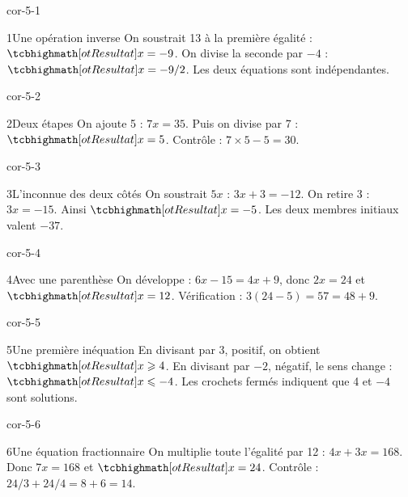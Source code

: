 \clearpage\pagestyle{otMain}\fontsize{11}{15}\selectfont{}
\begin{blocLivre}{cor-5-1}\begin{corrige}{1}{Une opération inverse}
On soustrait 13 à la première égalité : $\res{x=-9}$. On divise la seconde par $-4$ : $\res{x=-9/2}$. Les deux équations sont indépendantes.
\end{corrige}\end{blocLivre}
\begin{blocLivre}{cor-5-2}\begin{corrige}{2}{Deux étapes}
On ajoute 5 : $7x=35$. Puis on divise par 7 : $\res{x=5}$. Contrôle : $7\times5-5=30$.
\end{corrige}\end{blocLivre}
\begin{blocLivre}{cor-5-3}\begin{corrige}{3}{L’inconnue des deux côtés}
On soustrait $5x$ : $3x+3=-12$. On retire 3 : $3x=-15$. Ainsi $\res{x=-5}$. Les deux membres initiaux valent $-37$.
\end{corrige}\end{blocLivre}
\begin{blocLivre}{cor-5-4}\begin{corrige}{4}{Avec une parenthèse}
On développe : $6x-15=4x+9$, donc $2x=24$ et $\res{x=12}$. Vérification : $3(24-5)=57=48+9$.
\end{corrige}\end{blocLivre}
\begin{blocLivre}{cor-5-5}\begin{corrige}{5}{Une première inéquation}
En divisant par 3, positif, on obtient $\res{x\ge4}$. En divisant par $-2$, négatif, le sens change : $\res{x\le-4}$. Les crochets fermés indiquent que 4 et $-4$ sont solutions.
\label{fig-cor-5-5}
\end{corrige}\end{blocLivre}
\begin{blocLivre}{cor-5-6}\begin{corrige}{6}{Une équation fractionnaire}
On multiplie toute l’égalité par 12 : $4x+3x=168$. Donc $7x=168$ et $\res{x=24}$. Contrôle : $24/3+24/4=8+6=14$.
\end{corrige}\end{blocLivre}
